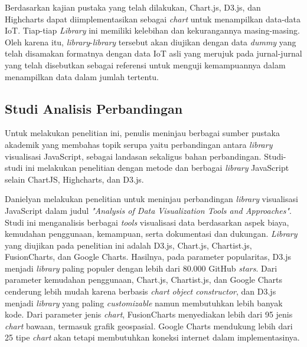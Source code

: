 Berdasarkan kajian pustaka yang telah dilakukan, Chart.js, D3.js, dan Highcharts dapat diimplementasikan sebagai \textit{chart} untuk menampilkan data-data IoT. Tiap-tiap \textit{Library} ini memiliki kelebihan dan kekurangannya masing-masing. Oleh karena itu, \textit{library}-\textit{library} tersebut akan diujikan dengan data \textit{dummy} yang telah disamakan formatnya dengan data IoT asli yang merujuk pada jurnal-jurnal yang telah disebutkan sebagai referensi untuk menguji kemampuannya dalam menampilkan data dalam jumlah tertentu. 

\subsection{Studi Analisis Perbandingan}
Untuk melakukan penelitian ini, penulis meninjau berbagai sumber pustaka akademik yang membahas topik serupa yaitu perbandingan antara \textit{library} visualisasi JavaScript, sebagai landasan sekaligus bahan perbandingan. Studi-studi ini melakukan penelitian dengan metode dan berbagai \textit{library} JavaScript selain ChartJS, Highcharts, dan D3.js. 

Danielyan \cite{Danielyan2018} melakukan penelitian untuk meninjau perbandingan \textit{library} visualisasi JavaScript dalam judul \textit{"Analysis of Data Visualization Tools and Approaches"}. Studi ini menganalisis berbagai \textit{tools} visualisasi data berdasarkan aspek biaya, kemudahan penggunaan, kemampuan, serta dokumentasi dan dukungan. \textit{Library} yang diujikan pada penelitian ini adalah D3.js, Chart.js, Chartist.js, FusionCharts, dan Google Charts. Hasilnya, pada  parameter popularitas,  D3.js menjadi \textit{library} paling populer dengan lebih dari 80.000 GitHub \textit{stars}. Dari parameter kemudahan penggunaan, Chart.js, Chartist.js, dan Google Charts cenderung lebih mudah karena berbasis \textit{chart object constructor}, dan D3.js menjadi \textit{library} yang paling \textit{customizable} namun membutuhkan lebih banyak kode. Dari parameter jenis \textit{chart}, FusionCharts menyediakan lebih dari 95 jenis \textit{chart} bawaan, termasuk grafik geospasial. Google Charts mendukung lebih dari 25 tipe \textit{chart} akan tetapi membutuhkan koneksi internet dalam implementasinya. 

